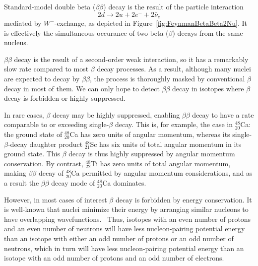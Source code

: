 Standard-model double beta ($\beta\beta$) decay is the result of the particle interaction
\begin{equation}\label{eqn:bb2n_decay_reaction}
2d \rightarrow 2u + 2e^- + 2\bar{\nu}_e
\end{equation}
mediated by $W^-$-exchange, as depicted in Figure~\ref{fig:FeynmanBetaBeta2Nu}.  It is effectively the simultaneous occurance of two beta ($\beta$) decays from the same nucleus.

$\beta\beta$ decay is the result of a second-order weak interaction, so it has a remarkably slow rate compared to most $\beta$ decay processes.  As a result, although many nuclei are expected to decay by $\beta\beta$, the process is thoroughly masked by conventional $\beta$ decay in most of them.  We can only hope to detect $\beta\beta$ decay in isotopes where $\beta$ decay is forbidden or highly suppressed.

In rare cases, $\beta$ decay may be highly suppressed, enabling $\beta\beta$ decay to have a rate comparable to or exceeding single-$\beta$ decay.  This is, for example, the case in $^{48}_{20}$Ca: the ground state of $^{48}_{20}$Ca has zero units of angular momentum, whereas its single-$\beta$-decay daughter product $^{48}_{21}$Sc has six units of total angular momentum in its ground state.  This $\beta$ decay is thus highly suppressed by angular momentum conservation.  By contrast, $^{48}_{22}$Ti has zero units of total angular momentum, making $\beta\beta$ decay of $^{48}_{20}$Ca permitted by angular momentum considerations, and as a result the $\beta\beta$ decay mode of $^{48}_{20}$Ca dominates.~\cite{MyNuclearPhysicsBook}

However, in most cases of interest $\beta$ decay is forbidden by energy conservation.  It is well-known that nuclei minimize their energy by arranging similar nucleons to have overlapping wavefunctions.~\cite{MyNuclearPhysicsBook}  Thus, isotopes with an even number of protons and an even number of neutrons will have less nucleon-pairing potential energy than an isotope with either an odd number of protons or an odd number of neutrons, which in turn will have less nucleon-pairing potential energy than an isotope with an odd number of protons and an odd number of electrons.

